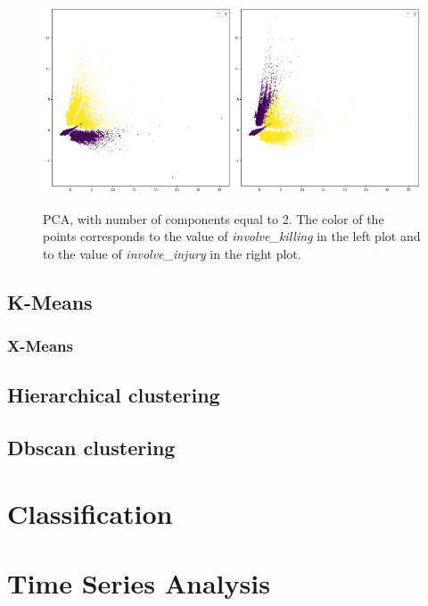 \documentclass[10pt,a4paper]{report}
\begin{document}
\begin{figure}[h]
	\centering
	\includegraphics[width=0.5\textwidth]{pca_killing}\includegraphics[width=0.5\textwidth]{pca_injury}
	\caption{PCA, with number of components equal to 2.
	The color of the points corresponds to the value of \textit{involve\_killing} in the left plot and to the value of \textit{involve\_injury} in the right plot.}
	\label{pca}
\end{figure}

\section{K-Means}

\subsection{X-Means}

\section{Hierarchical clustering}

\section{Dbscan clustering}

\chapter{Classification}

\chapter{Time Series Analysis}
\end{document}
